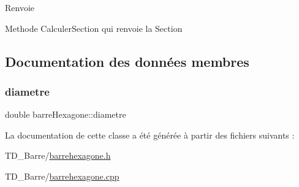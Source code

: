 \begin{DoxyReturn}{Renvoie}

\end{DoxyReturn}
Methode Calculer\+Section qui renvoie la Section 

\subsection{Documentation des données membres}
\mbox{\label{classbarre_hexagone_ac91cbf9757ea749c85603df250abb62c}} 
\subsubsection{\texorpdfstring{diametre}{diametre}}
{\footnotesize\ttfamily double barre\+Hexagone\+::diametre\hspace{0.3cm}{\ttfamily [protected]}}



La documentation de cette classe a été générée à partir des fichiers suivants \+:\begin{DoxyCompactItemize}
\item 
T\+D\+\_\+\+Barre/\hyperlink{barrehexagone_8h}{barrehexagone.\+h}\item 
T\+D\+\_\+\+Barre/\hyperlink{barrehexagone_8cpp}{barrehexagone.\+cpp}\end{DoxyCompactItemize}
